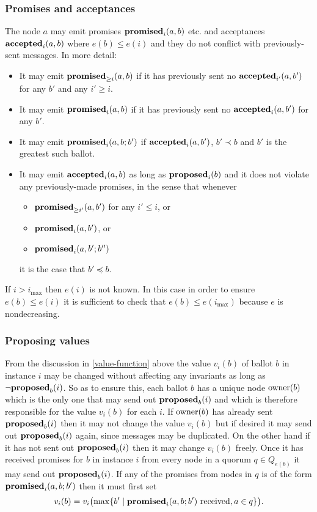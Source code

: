 \documentclass[journal]{IEEEtran}
\begin{document}
\subsubsection{Promises and acceptances} The node $a$ may emit promises
$\mathbf{promised}_{i}(a,b)$ etc. and acceptances $\mathbf{accepted}_{i}(a,b)$ where $e(b) \le e(i)$
and they do not conflict with previously-sent messages. In more detail:
\begin{itemize} \item It may emit $\mathbf{promised}_{\ge i}(a,b)$ if it has previously sent
no $\mathbf{accepted}_{i'}(a,b')$ for any $b'$ and any $i' \ge i$. \item It may emit
$\mathbf{promised}_{i}(a,b)$ if it has previously sent no $\mathbf{accepted}_{i}(a,b')$ for any $b'$.
\item It may emit $\mathbf{promised}_{i}(a,b;b')$ if $\mathbf{accepted}_{i}(a,b')$, $b' \prec b$ and
$b'$ is the greatest such ballot. \item It may emit $\mathbf{accepted}_{i}(a,b)$ as long as
$\mathbf{proposed}_{i}(b)$ and it does not violate any previously-made promises, in the
sense that whenever \begin{itemize} \item $\mathbf{promised}_{\ge i'}(a,b')$ for any $i' \le
i$, or \item $\mathbf{promised}_{i}(a,b')$, or \item $\mathbf{promised}_{i}(a,b';b'')$\end{itemize}
it is the case that $b' \preceq b$. \end{itemize}

If $i > i_\mathrm{max}$ then $e(i)$ is not known. In this case in order to
ensure $e(b) \le e(i)$ it is sufficient to check that $e(b) \le
e(i_\mathrm{max})$ because $e$ is nondecreasing.

\subsubsection{Proposing values} From the discussion in \ref{value-function}
above the value $v_i(b)$ of ballot $b$ in instance $i$ may be changed without
affecting any invariants as long as $\neg\mathbf{proposed}_{b}(i)$. So as to ensure this,
each ballot $b$ has a unique node $\mathrm{owner}(b)$ which is the only one that may
send out $\mathbf{proposed}_{b}(i)$ and which is therefore responsible for the value
$v_i(b)$ for each $i$. If $\mathrm{owner}(b)$ has already sent $\mathbf{proposed}_{b}(i)$ then it
may not change the value $v_i(b)$ but if desired it may send out $\mathbf{proposed}_{b}(i)$
again, since messages may be duplicated. On the other hand if it has not sent
out $\mathbf{proposed}_{b}(i)$ then it may change $v_i(b)$ freely. Once it has received
promises for $b$ in instance $i$ from every node in a quorum $q \in Q_{e(b)}$
it may send out $\mathbf{proposed}_{b}(i)$. If any of the promises from nodes in $q$ is of
the form $\mathbf{promised}_{i}(a,b;b')$ then it must first set \[v_i(b) =
v_i\bigl(\mathrm{max} \{b' \mid \mathbf{promised}_{i}(a,b;b') \textrm{ received}, a \in q
\}\bigr).\]
\end{document}
